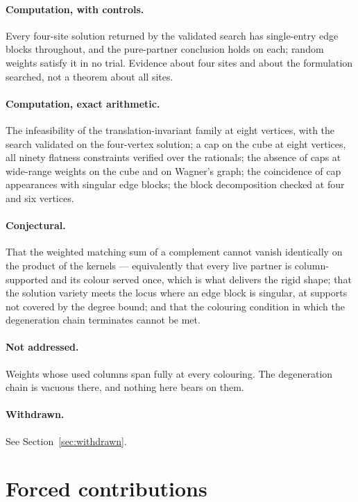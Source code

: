 \documentclass[11pt]{article}
\theoremstyle{definition}
\theoremstyle{remark}
\begin{document}
\paragraph{Computation, with controls.} Every four-site solution returned by the
validated search has single-entry edge blocks throughout, and the pure-partner conclusion
holds on each; random weights satisfy it in no trial. Evidence about four sites and about
the formulation searched, not a theorem about all sites.

\paragraph{Computation, exact arithmetic.} The infeasibility of the translation-invariant
family at eight vertices, with the search validated on the four-vertex solution; a cap on
the cube at eight vertices, all
ninety flatness constraints verified over the rationals; the absence of caps at
wide-range weights on the cube and on Wagner's graph; the coincidence of cap appearances
with singular edge blocks; the block decomposition checked at four and six vertices.

\paragraph{Conjectural.} That the weighted matching sum of a complement cannot vanish
identically on the product of the kernels --- equivalently that every live partner is
column-supported and its colour served once, which is what delivers the rigid shape; that the
solution variety meets the locus where an edge block is singular, at supports not covered by the degree bound; and that the colouring
condition in which the degeneration chain terminates cannot be met.

\paragraph{Not addressed.} Weights whose used columns span fully at every colouring. The
degeneration chain is vacuous there, and nothing here bears on them.

\paragraph{Withdrawn.} See Section~\ref{sec:withdrawn}.

\section{Forced contributions}\label{sec:forced}
\end{document}
